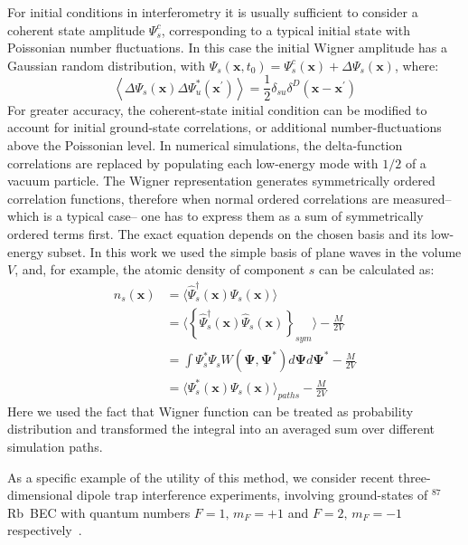 \documentclass[aps,prl,twocolumn,showpacs,amsmath,amssymb,superscriptaddress]{revtex4-1}
\newcommand{\Rb}{$^{87}$Rb}
\newcommand{\xvec}{\boldsymbol{x}}
\newcommand{\Psivec}{\boldsymbol{\Psi}}
\begin{document}
For initial conditions in interferometry it is usually sufficient
to consider a coherent state amplitude $\Psi_{s}^{c}$,
corresponding to a typical initial state with Poissonian number fluctuations.
In this case the initial Wigner amplitude has a Gaussian random distribution,
with $\Psi_{s}(\xvec,t_{0})=\Psi_{s}^{c}(\xvec)+\Delta\Psi_{s}(\xvec)$,
where:
\begin{equation}
	\left\langle
		\Delta\Psi_{s}(\xvec) \Delta\Psi_{u}^{*}(\xvec^\prime)
	\right\rangle =
	\frac{1}{2} \delta_{su} \delta^{D} \left( \xvec - \xvec^\prime\right)
\end{equation}
For greater accuracy, the coherent-state initial condition
can be modified to account for initial ground-state correlations,
or additional number-fluctuations above the Poissonian level.
In numerical simulations, the delta-function correlations are replaced by
populating each low-energy mode with $1/2$ of a vacuum particle.
The Wigner representation generates symmetrically ordered correlation functions,
therefore when normal ordered correlations are measured\---which is a typical case\---
one has to express them as a sum of symmetrically ordered terms first.
The exact equation depends on the chosen basis and its low-energy subset.
In this work we used the simple basis of plane waves in the volume $V$,
and, for example, the atomic density of component $s$ can be calculated as:
\begin{equation}
\begin{split}
n_{s} (\xvec) & =
\langle \widehat{\Psi}^\dagger_{s} (\xvec) \widehat{\Psi}_{s} (\xvec) \rangle \\
& = \langle \left\{ \widehat{\Psi}^\dagger_{s} (\xvec)
	\widehat{\Psi}_{s} (\xvec) \right\}_{sym} \rangle -	\frac{M}{2V} \\
& = \int \Psi^*_{s} \Psi_{s} W(\Psivec, \Psivec^*) d\Psivec d\Psivec^* - \frac{M}{2V} \\
& = \langle \Psi^*_{s} (\xvec) \Psi_{s} (\xvec) \rangle_{paths} - \frac{M}{2V}
\end{split}
\end{equation}
Here we used the fact that Wigner function can be treated as probability distribution
and transformed the integral into an averaged sum over different simulation paths.

As a specific example of the utility of this method,
we consider recent three-dimensional dipole trap interference experiments,
involving ground-states of \Rb~BEC with quantum numbers $F=1,\, m_{F}=+1$
and $F=2,\, m_{F}=-1$ respectively~\cite{Egorov2010}.
\end{document}
